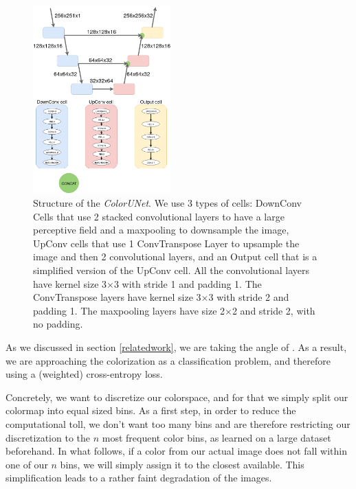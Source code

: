 \documentclass[10pt,twocolumn,letterpaper]{article}
\begin{document}
\begin{figure}
\begin{center}
\includegraphics[width=200px]{diagram}
\caption{Structure of the \textit{ColorUNet}. We use 3 types of cells: DownConv Cells that use 2 stacked convolutional layers to have a large perceptive field and a maxpooling to downsample the image, UpConv cells that use 1 ConvTranspose Layer to upsample the image and then 2 convolutional layers, and an Output cell that is a simplified version of the UpConv cell. All the convolutional layers have kernel size 3$\times$3  with stride 1 and padding 1. The ConvTranspose layers have kernel size 3$\times$3 with stride 2 and padding 1. The maxpooling layers have size 2$\times$2 and stride 2, with no padding. }
\label{structure}
\end{center}
\end{figure}
As we discussed in section \ref{relatedwork}, we are taking the angle of \cite{zhang2016colorful}. As a result, we are approaching the colorization as a classification problem, and therefore using a (weighted) cross-entropy loss.

Concretely, we want to discretize our colorspace, and for that we simply split our colormap into equal sized bins. As a first step, in order to reduce the computational toll, we don't want too many bins and are therefore restricting our discretization to the $n$ most frequent color bins, as learned on a large dataset beforehand. In what follows, if a color from our actual image does not fall within one of our $n$ bins, we will simply assign it to the closest available. This simplification leads to a rather faint degradation of the images.
\end{document}
